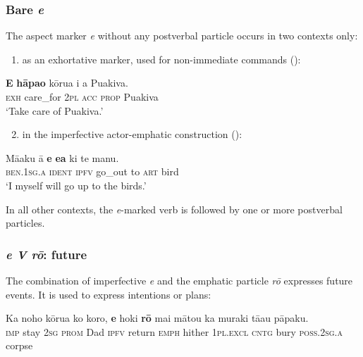 \subsubsection[Bare e]{Bare \textit{e}}\label{sec:7.2.5.2}

The aspect marker \textit{e} without any postverbal particle occurs in two contexts only: 

\begin{enumerate}
\item
as an exhortative marker, used for non-immediate commands ():
\end{enumerate}

\ea\label{ex:7.26}
\gll \textbf{E} \textbf{hāpa{\ꞌ}o} kōrua i a Puakiva. \\
\textsc{exh} care\_for \textsc{2pl} \textsc{acc} \textsc{prop} Puakiva \\

\glt
‘Take care of Puakiva.’ \textstyleExampleref{[R229.420–421]}
\z

\begin{enumerate}
\setcounter{enumi}{1} 
\item
in the imperfective actor-emphatic construction ():
\end{enumerate}
\ea\label{ex:7.27}
\gll Mā{\ꞌ}aku {\ꞌ}ā \textbf{e} \textbf{e{\ꞌ}a} ki te manu. \\
\textsc{ben.1sg.a} \textsc{ident} \textsc{ipfv} go\_out to \textsc{art} bird \\

\glt
‘I myself will go up to the birds.’ \textstyleExampleref{[Egt-01.014]}
\z

In all other contexts, the \textit{e}{}-marked verb is followed by one or more postverbal particles.

\subsubsection{\textit{e V rō}: future}\label{sec:7.2.5.3}
The combination of imperfective \textit{e} and the emphatic particle \textit{rō} expresses future events. It is used to express intentions or plans:

\ea\label{ex:7.28}
\gll Ka noho kōrua ko koro, \textbf{e} hoki \textbf{rō} mai mātou ka muraki tā{\ꞌ}au pāpaku.\\
\textsc{imp} stay \textsc{2sg} \textsc{prom} Dad \textsc{ipfv} return \textsc{emph} hither \textsc{1pl.excl} \textsc{cntg} bury \textsc{poss.2sg.a} corpse\\

